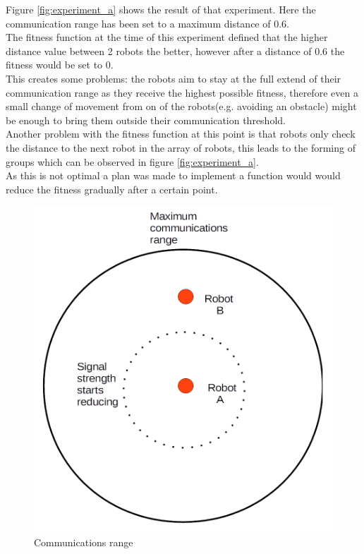 Figure \ref{fig:experiment_a} shows the result of that experiment. 
Here the communication range has been set to a maximum distance of 0.6. \\
The fitness function at the time of this experiment defined that the higher distance value between 2 robots the better, however after a distance of 0.6 the fitness would be set to 0.\\
This creates some problems: the robots aim to stay at the full extend of their communication range as they receive the highest possible fitness, therefore even a small change of movement from on of the robots(e.g. avoiding an obstacle) might be enough to bring them outside their communication threshold. \\
Another problem with the fitness function at this point is that robots only check the distance to the next robot in the array of robots, this leads to the forming of groups which can be observed in figure \ref{fig:experiment_a}. \\

As this is not optimal a plan was made to implement a function would would reduce the fitness gradually after a certain point. 

\begin{figure}[h]
\centering
\includegraphics[scale=0.5]{Chapter4/images/comms.png}
\caption{Communications range}
\label{fig:coms}
\end{figure}

